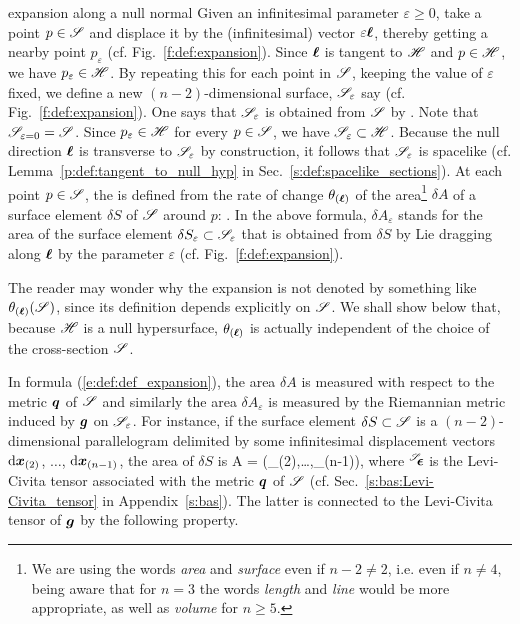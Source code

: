 \begin{tdef}{expansion along a null normal}{}
Given an infinitesimal parameter $\varepsilon\geq 0$, take a point
$p\in \mathscr{S}$ and displace it by the (infinitesimal) vector $\varepsilon \bm{\ell}$, thereby getting
a nearby point $p_\varepsilon$ (cf. Fig.~\ref{f:def:expansion}).
Since $\bm{\ell}$ is tangent to $\mathscr{H}$ and $p\in\mathscr{H}$, we have $p_\varepsilon\in\mathscr{H}$.
By repeating this for each point in $\mathscr{S}$,
keeping the value of $\varepsilon$ fixed, we define a new $(n-2)$-dimensional surface,
$\mathscr{S}_\varepsilon$ say (cf. Fig.~\ref{f:def:expansion}). One says that $\mathscr{S}_\varepsilon$ is obtained
from $\mathscr{S}$ by .
Note that $\mathscr{S}_{\varepsilon=0} = \mathscr{S}$.
Since $p_\varepsilon\in\mathscr{H}$ for every $p\in\mathscr{S}$, we have $\mathscr{S}_\varepsilon\subset \mathscr{H}$.
Because the null direction $\bm{\ell}$ is transverse to $\mathscr{S}_\varepsilon$ by construction, it
follows that $\mathscr{S}_\varepsilon$ is spacelike (cf. Lemma~\ref{p:def:tangent_to_null_hyp}
in Sec.~\ref{s:def:spacelike_sections}).
At each point $p\in\mathscr{S}$, the  is defined from the
rate of change $\theta_{(\bm{\ell})}$ of the area\footnote{We are using the words
\emph{area} and \emph{surface} even if $n-2 \not= 2$, i.e. even if $n\not = 4$,
being aware that for $n=3$ the words \emph{length} and \emph{line} would
be more appropriate, as well as \emph{volume} for $n\geq 5$.}
$\delta A$ of a surface element $\delta S$ of
$\mathscr{S}$ around $p$:
\be \label{e:def:def_expansion}
    .
\ee
In the above formula, $\delta A_\varepsilon$ stands for the area of the
surface element $\delta S_\varepsilon\subset \mathscr{S}_\varepsilon$ that is obtained from $\delta S$ by
Lie dragging along $\bm{\ell}$ by the parameter $\varepsilon$ (cf. Fig.~\ref{f:def:expansion}).
\end{tdef}


\begin{remark} \label{r:def:expansion_indpt_S}
The reader may wonder why the expansion is not denoted by something like
$\theta_{(\bm{\ell})}(\mathscr{S})$, since its definition depends explicitly on
$\mathscr{S}$. We shall show below that, because $\mathscr{H}$ is a null hypersurface, $\theta_{(\bm{\ell})}$
is actually independent of the choice of the cross-section $\mathscr{S}$.
\end{remark}

In formula (\ref{e:def:def_expansion}), the area $\delta A$ is measured with
respect to the metric $\bm{q}$ of $\mathscr{S}$ and similarly the area $\delta A_\varepsilon$
is measured by the Riemannian metric induced by $\bm{g}$ on $\mathscr{S}_\varepsilon$.
For instance, if the surface element $\delta S \subset\mathscr{S}$ is a $(n-2)$-dimensional
parallelogram delimited by some infinitesimal displacement vectors
$\mathrm{d}\bm{x}_{(2)}$, $\ldots$, $\mathrm{d}\bm{x}_{(n-1)}$, the area of $\delta S$ is
\be \label{e:def:A_wepsS_dx}
    \delta A = \wepsS(\D{}_{(2)},\ldots,\D{}_{(n-1)}),
\ee
where ${}^{\mathscr{S}}\!\!\bm{\epsilon}$ is the Levi-Civita tensor
associated with the metric $\bm{q}$
of $\mathscr{S}$ (cf. Sec.~\ref{s:bas:Levi-Civita_tensor} in Appendix~\ref{s:bas}).
The latter is connected to the Levi-Civita tensor of $\bm{g}$ by
the following property.

